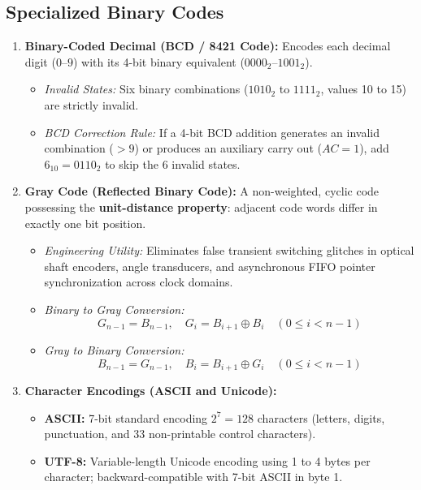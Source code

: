 \subsection{Specialized Binary Codes}
\begin{enumerate}[label=\bfseries\arabic*.]
    \item \textbf{Binary-Coded Decimal (BCD / 8421 Code):} Encodes each decimal digit ($0$--$9$) with its 4-bit binary equivalent ($0000_2$--$1001_2$).
    \begin{itemize}
        \item \textit{Invalid States:} Six binary combinations ($1010_2$ to $1111_2$, values 10 to 15) are strictly invalid.
        \item \textit{BCD Correction Rule:} If a 4-bit BCD addition generates an invalid combination ($> 9$) or produces an auxiliary carry out ($AC=1$), add $6_{10} = 0110_2$ to skip the 6 invalid states.
    \end{itemize}
    \item \textbf{Gray Code (Reflected Binary Code):} A non-weighted, cyclic code possessing the \textbf{unit-distance property}: adjacent code words differ in exactly one bit position.
    \begin{itemize}
        \item \textit{Engineering Utility:} Eliminates false transient switching glitches in optical shaft encoders, angle transducers, and asynchronous FIFO pointer synchronization across clock domains.
        \item \textit{Binary to Gray Conversion:}
        \[ G_{n-1} = B_{n-1}, \quad G_i = B_{i+1} \oplus B_i \quad (0 \le i < n-1) \]
        \item \textit{Gray to Binary Conversion:}
        \[ B_{n-1} = G_{n-1}, \quad B_i = B_{i+1} \oplus G_i \quad (0 \le i < n-1) \]
    \end{itemize}
    \item \textbf{Character Encodings (ASCII and Unicode):}
    \begin{itemize}
        \item \textbf{ASCII:} 7-bit standard encoding $2^7 = 128$ characters (letters, digits, punctuation, and 33 non-printable control characters).
        \item \textbf{UTF-8:} Variable-length Unicode encoding using 1 to 4 bytes per character; backward-compatible with 7-bit ASCII in byte 1.
    \end{itemize}
\end{enumerate}




